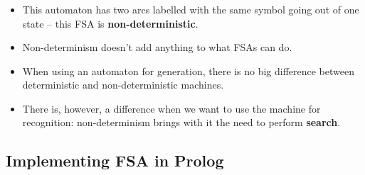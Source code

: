 \begin{frame}

	\frametitle{\insertsection}
	\framesubtitle{\insertsubsection}
	
	\begin{itemize}
		\item This automaton has two arcs labelled with the same symbol going out of one state -- this FSA is \textbf{non-deterministic}.
		\item Non-determinism doesn't add anything to what FSAs can do.
		\item When using an automaton for generation, there is no big difference between deterministic and non-deterministic machines.
		\item There is, however, a difference when we want to use the machine for recognition: non-determinism brings with it the need to perform \textbf{search}.
	\end{itemize}

\end{frame}


\subsection{Implementing FSA in Prolog}


\begin{frame}

	\frametitle{\insertsection}
	\framesubtitle{\insertsubsection}
	

\end{frame}


